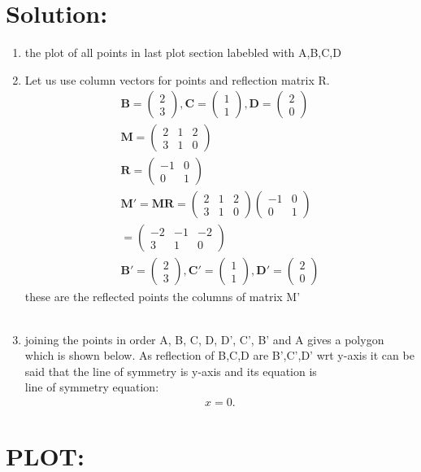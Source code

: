 \documentclass[journal,12pt,twocolumn]{IEEEtran}
\newcommand{\myvec}[1]{\ensuremath{\begin{pmatrix}#1\end{pmatrix}}}
\let\vec\mathbf
\begin{document}
	\section{Solution:}
	\begin{enumerate}[label=(1.\arabic*)]
		\item the plot of all points in last plot section labebled with  A,B,C,D\\
		\item Let us use column vectors for points and reflection matrix R.\\
		\begin{align*}
		\vec{B}=\myvec{2\\3}  ,
		\vec{C}=\myvec{1\\1}  ,
	    \vec{D}=\myvec{2\\0}
		 \\
	    \vec{M}=\myvec{2&1&2\\3&1&0}
	    \\
		\vec{R}=\myvec{-1& 0\\ 0 & 1}
		\\
		\vec{M'}=\vec{MR}=\myvec{2&1&2\\3&1&0}\myvec{-1& 0\\ 0 & 1}
		\\
		  =\myvec{-2&-1&-2\\3&1&0}
		  \\   
		  	\vec{B'}=\myvec{2\\3} , 
		  	\vec{C'}=\myvec{1\\1} ,  
		  	\vec{D'}=\myvec{2\\0}
		 \end{align*}
	 these are the reflected points the columns of matrix M'\\\\
		\item joining the points in order  A, B, C, D, D', C', B' and A gives a polygon which is shown below.
		 As reflection of B,C,D are B',C',D' wrt y-axis it can be said that the line of symmetry is y-axis and its equation is \\
		line of symmetry equation:
		\begin{align*}
			\label{line of symmetry equation}
			x=0.
		\end{align*}
		
	\end{enumerate}      
	\section{PLOT:}
	
\end{document}
